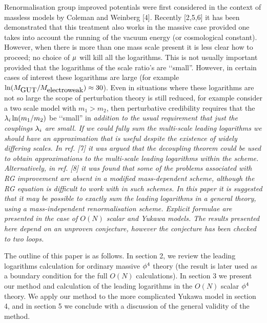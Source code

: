Renormalisation group improved
potentials were first considered in the context of massless models
by Coleman and Weinberg [4]. Recently [2,5,6] it has been demonstrated that
this treatment also works in the massive case provided one takes
into account the running of the vacuum energy (or cosmological
constant).
 However, when there is more than one mass scale present
it is less clear how to proceed; no choice of $\mu$ will kill all the
logarithms.  This is not usually important provided that the
logarithms of the scale ratio's are \lq\lq small''. However, in certain
cases of interest these logarithms are large (for example
$\ln(M_{\hbox{GUT}}/M_{\hbox{electroweak}})\approx 30$). Even in
situations where these logarithms are not so large the scope of
perturbation theory is still reduced, for example consider a two
scale model with $m_1>m_2$, then perturbative credibility requires
that the $\lambda_i\ln(m_1/m_2)$ be \lq\lq small'' in \sl addition \rm to the usual
requirement that just the couplings $\lambda_i$ are small. If we could
fully
sum the multi-scale leading logarithms we should have an
approximation that is useful despite the existence of widely
differing scales.
 In ref. [7] it was argued that the decoupling theorem
could be used to obtain approximations to the multi-scale leading
logarithms within the \M  scheme. Alternatively, in ref. [8] it
was found that some of the problems associated with RG improvement
are absent in a modified mass-dependent scheme, although the RG
equation is difficult to work with in such schemes.
 In this paper it is suggested that it
may be possible to \sl exactly \rm sum the leading logarithms in a
general theory, using a mass-independent renormalisation scheme.
 Explicit formulae are presented in the case of
$O(N)$ scalar and Yukawa models. The results presented here depend
on an unproven conjecture, however the conjecture has been checked
to two loops.

The outline of this paper is as follows. In section 2, we review the
leading logarithms calculation for ordinary massive $\phi^4$ theory
(the result is later used as a boundary condition for the full
$O(N)$ calculations). In section 3 we present our method and
calculation of the leading logarithms in the $O(N)$ scalar $\phi^4$
theory. We apply our method to the more complicated Yukawa model in
section 4, and in section 5 we conclude with a discussion of the
general validity of the method.

\line{\hfill}
\line{\hfill}

